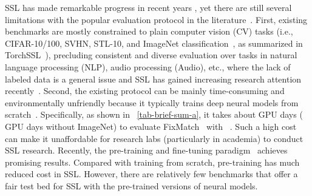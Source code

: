 \documentclass{article}
\newcommand{\revision}[1]{{\color{black}{#1}}}
\begin{document}
SSL has made remarkable progress in recent years \cite{zhai2019s4l,li2020dividemix,chen2020big,pham2021meta,sohn2020fixmatch,zhang2021flexmatch}, yet there are still several limitations with the popular evaluation protocol in the literature~\cite{oliver2018realistic,sohn2020fixmatch,zhang2021flexmatch}.
First, existing benchmarks are mostly constrained to plain computer vision (CV) tasks (i.e., CIFAR-10/100, SVHN, STL-10, and ImageNet classification~\cite{oliver2018realistic,berthelot2019remixmatch,sohn2020fixmatch,xu2021dash,zhang2021flexmatch}, as summarized in TorchSSL~\cite{zhang2021flexmatch}), precluding consistent and diverse evaluation over tasks in natural language processing (NLP), audio processing (Audio), etc., where the lack of labeled data is a general issue and SSL has gained increasing research attention recently~\cite{chen2020mixtext,baskar2019semi,cances2022comparison}. Second, the existing protocol \revision{(e.g., TorchSSL~\cite{zhang2021flexmatch})} can be mainly time-consuming and environmentally unfriendly because it typically trains deep neural models from scratch~\cite{berthelot2019mixmatch,berthelot2019remixmatch,xie2020unsupervised,sohn2020fixmatch,xu2021dash,zhang2021flexmatch}. Specifically, as shown in \tablename~\ref{tab-brief-sum-a}, it takes about  GPU days ( GPU days without ImageNet) to evaluate FixMatch~\cite{sohn2020fixmatch} with \revision{TorchSSL}~\cite{zhang2021flexmatch}. Such a high cost can make it unaffordable for research labs (particularly in academia) to conduct SSL research. Recently, the pre-training and fine-tuning paradigm~\cite{bert,liu2019roberta,hsu2021hubert,he2021masked} achieves promising results.
Compared with training from scratch, pre-training has much reduced cost in SSL.
However, there are relatively few benchmarks that offer a fair test bed for SSL with the pre-trained versions of neural models.
\end{document}
